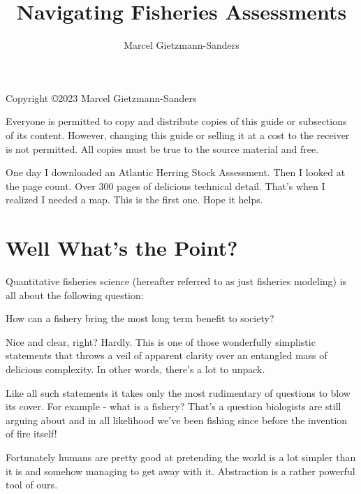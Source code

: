 \documentclass[11pt,a5paper]{book}
\title{Navigating Fisheries Assessments}
\author{Marcel Gietzmann-Sanders}
\date{}
\begin{document}
\maketitle
\newpage
\mbox{}
\vfill

\noindent
Copyright \copyright 2023 Marcel Gietzmann-Sanders
\newline

\noindent
Everyone is permitted to copy and distribute copies of this guide or subsections of its content. However, changing this guide or selling it at a cost to the receiver is not permitted. All copies must be true to the source material and free.
\newpage
\null
\newpage

One day I downloaded an Atlantic Herring Stock Assessment. Then I looked at the page count. Over 300 pages of delicious technical detail. That's when I realized I needed a map. This is the first one. Hope it helps.
\newpage
\null
\newpage

\tableofcontents
\newpage

\chapter{Well What's the Point?}

Quantitative fisheries science (hereafter referred to as just fisheries modeling) is all about the following question:
\newline

 \hangindent=1cm \noindent How can a fishery bring the most long term benefit to society?
\newline

Nice and clear, right? Hardly. This is one of those wonderfully simplistic statements that throws a veil of apparent clarity over an entangled mass of delicious complexity. In other words, there's a lot to unpack.
\newline

Like all such statements it takes only the most rudimentary of questions to blow its cover. For example - what is a fishery? That's a question biologists are still arguing about and in all likelihood we've been fishing since before the invention of fire itself! 
\newline

Fortunately humans are pretty good at pretending the world is a lot simpler than it is and somehow managing to get away with it. Abstraction is a rather powerful tool of ours.
\newline
\end{document}
